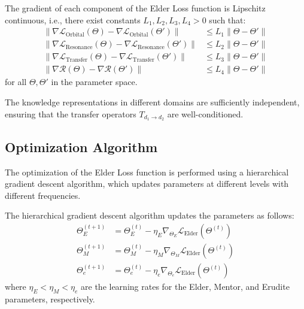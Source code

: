 \begin{assumption}
The gradient of each component of the Elder Loss function is Lipschitz continuous, i.e., there exist constants $L_1, L_2, L_3, L_4 > 0$ such that:
\begin{align}
\|\nabla \mathcal{L}_{\text{Orbital}}(\Theta) - \nabla \mathcal{L}_{\text{Orbital}}(\Theta')\| &\leq L_1 \|\Theta - \Theta'\| \\
\|\nabla \mathcal{L}_{\text{Resonance}}(\Theta) - \nabla \mathcal{L}_{\text{Resonance}}(\Theta')\| &\leq L_2 \|\Theta - \Theta'\| \\
\|\nabla \mathcal{L}_{\text{Transfer}}(\Theta) - \nabla \mathcal{L}_{\text{Transfer}}(\Theta')\| &\leq L_3 \|\Theta - \Theta'\| \\
\|\nabla \mathcal{R}(\Theta) - \nabla \mathcal{R}(\Theta')\| &\leq L_4 \|\Theta - \Theta'\|
\end{align}
for all $\Theta, \Theta'$ in the parameter space.
\end{assumption}

\begin{assumption}
The knowledge representations in different domains are sufficiently independent, ensuring that the transfer operators $T_{d_1 \rightarrow d_2}$ are well-conditioned.
\end{assumption}

\subsection{Optimization Algorithm}

The optimization of the Elder Loss function is performed using a hierarchical gradient descent algorithm, which updates parameters at different levels with different frequencies.

\begin{definition}
The hierarchical gradient descent algorithm updates the parameters as follows:
\begin{align}
\Theta_E^{(t+1)} &= \Theta_E^{(t)} - \eta_E \nabla_{\Theta_E} \mathcal{L}_{\text{Elder}}(\Theta^{(t)}) \\
\Theta_M^{(t+1)} &= \Theta_M^{(t)} - \eta_M \nabla_{\Theta_M} \mathcal{L}_{\text{Elder}}(\Theta^{(t)}) \\
\Theta_e^{(t+1)} &= \Theta_e^{(t)} - \eta_e \nabla_{\Theta_e} \mathcal{L}_{\text{Elder}}(\Theta^{(t)})
\end{align}
where $\eta_E < \eta_M < \eta_e$ are the learning rates for the Elder, Mentor, and Erudite parameters, respectively.
\end{definition}

